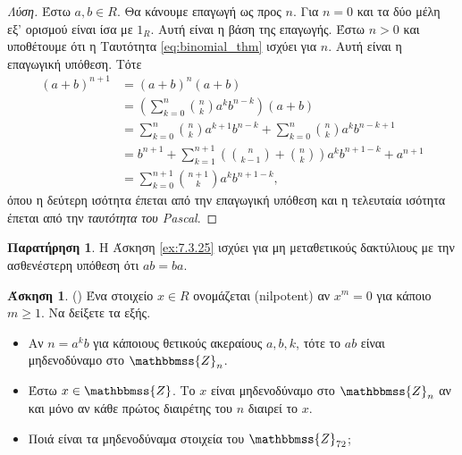 \documentclass[12pt,a4paper,reqno]{amsart}
\theoremstyle{definition}
\newtheorem{exercise}{Άσκηση}
\newtheorem*{remark}{Παρατήρηση}
\newcommand{\ZZ}{\mathbbmss{Z}}
\newcommand{\defn}[1]{{\color{mylightblue}{#1}}}
\begin{document}
\begin{proof}[Λύση]
  Έστω $a, b \in R$. Θα κάνουμε επαγωγή ως προς $n$. Για $n=0$ και τα δύο μέλη εξ' ορισμού είναι ίσα με $1_R$. Αυτή είναι η βάση της επαγωγής. Έστω $n > 0$ και υποθέτουμε ότι η Ταυτότητα \eqref{eq:binomial_thm} ισχύει για $n$. Αυτή είναι η επαγωγική υπόθεση. Τότε 
  \begin{align*}
    (a+b)^{n+1} &= (a+b)^n(a+b) \\ 
    &= \left(
      \sum_{k=0}^n \binom{n}{k} a^kb^{n-k}
    \right)(a+b) \\
    &= 
    \sum_{k=0}^n \binom{n}{k} a^{k+1}b^{n-k} + \sum_{k=0}^n \binom{n}{k} a^kb^{n-k+1} \\
    &=
    b^{n+1} + \sum_{k=1}^{n+1} \left(\binom{n}{k-1} + \binom{n}{k}\right) a^kb^{n+1-k} + a^{n+1} \\
    &= \sum_{k=0}^{n+1} \binom{n+1}{k} a^kb^{n+1-k},
  \end{align*}
  όπου η δεύτερη ισότητα έπεται από την επαγωγική υπόθεση και η τελευταία ισότητα έπεται από την \emph{ταυτότητα του Pascal}.
\end{proof}

\begin{remark}
  Η Άσκηση \ref{ex:7.3.25} ισχύει για μη μεταθετικούς δακτύλιους με την ασθενέστερη υπόθεση ότι $ab = ba$.
\end{remark}

\begin{exercise}{\rm(\cite[Ασκήσεις~7.1.13]{DF04})}
  Ένα στοιχείο $x \in R$ ονομάζεται \defn{μηδενοδύναμο} (nilpotent) αν $x^m=0$ για κάποιο $m \ge 1$. Να δείξετε τα εξής.
  \begin{itemize}
    \item[(1)] Αν $n = a^kb$ για κάποιους θετικούς ακεραίους $a, b, k$, τότε το $ab$ είναι μηδενοδύναμο στο $\ZZ_n$.
    \item[(2)] Έστω $x \in \ZZ$. Το $x$ είναι μηδενοδύναμο στο $\ZZ_n$ αν και μόνο αν κάθε πρώτος διαιρέτης του $n$ διαιρεί το $x$.
    \item[(3)] Ποιά είναι τα μηδενοδύναμα στοιχεία του $\ZZ_{72}$;
  \end{itemize}
\end{exercise}
\end{document}
